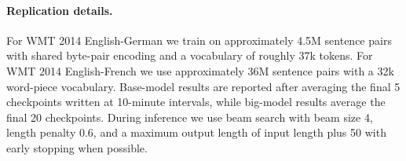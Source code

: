 \paragraph{Replication details.}
For WMT 2014 English-German we train on approximately 4.5M sentence pairs with shared byte-pair encoding and a vocabulary of roughly 37k tokens. For WMT 2014 English-French we use approximately 36M sentence pairs with a 32k word-piece vocabulary. Base-model results are reported after averaging the final 5 checkpoints written at 10-minute intervals, while big-model results average the final 20 checkpoints. During inference we use beam search with beam size 4, length penalty 0.6, and a maximum output length of input length plus 50 with early stopping when possible.
